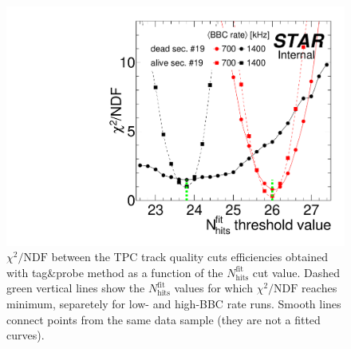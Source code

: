 \begin{figure}[b!]
\quad\quad%
\begin{minipage}{.4725\textwidth}%
  \centering%
  \includegraphics[width=\linewidth,page=1]{graphics/systematicsEfficiency/bbc_and/Chi2VsNHitsFitCut.pdf}%
  \caption[$\chi^{2}/\text{NDF}$ obtained in the search for the best $N_{\text{hits}}^{\text{fit}}$ cut value.]
   {$\chi^{2}/\text{NDF}$ between the TPC track quality cuts efficiencies obtained with tag\&probe method as a function of the $N_{\text{hits}}^{\text{fit}}$ cut value. Dashed green vertical lines show the $N_{\text{hits}}^{\text{fit}}$ values for which $\chi^{2}/\text{NDF}$ reaches minimum, separetely for low- and high-BBC rate runs. Smooth lines connect points from the same data sample (they are not a fitted curves).\newline}\label{fig:Chi2VsNHitsFitCut}%
\end{minipage}%
\end{figure}%

